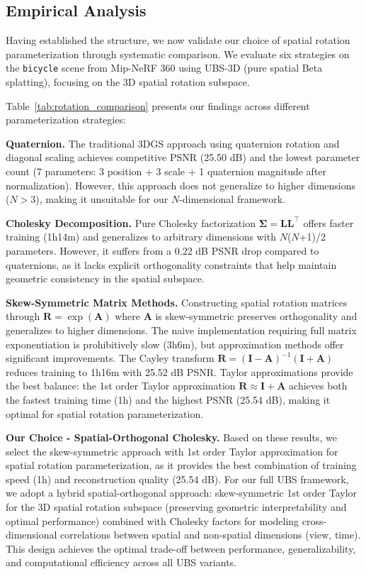 \documentclass{article} %
\begin{document}
\subsection{Empirical Analysis}

Having established the structure, we now validate our choice of spatial rotation parameterization through systematic comparison. We evaluate six strategies on the \texttt{bicycle} scene from Mip-NeRF 360 using UBS-3D (pure spatial Beta splatting), focusing on the 3D spatial rotation subspace.

Table~\ref{tab:rotation_comparison} presents our findings across different parameterization strategies:

\textbf{Quaternion.} The traditional 3DGS approach using quaternion rotation and diagonal scaling achieves competitive PSNR (25.50 dB) and the lowest parameter count (7 parameters: 3 position + 3 scale + 1 quaternion magnitude after normalization). However, this approach does not generalize to higher dimensions ($N > 3$), making it unsuitable for our $N$-dimensional framework.

\textbf{Cholesky Decomposition.} Pure Cholesky factorization $\bm{\Sigma} = \bm{L}\bm{L}^\top$ offers faster training (1h14m) and generalizes to arbitrary dimensions with $N$($N$+1)/2 parameters. However, it suffers from a 0.22 dB PSNR drop compared to quaternions, as it lacks explicit orthogonality constraints that help maintain geometric consistency in the spatial subspace.

\textbf{Skew-Symmetric Matrix Methods.} Constructing spatial rotation matrices through $\bm{R} = \exp(\bm{A})$ where $\bm{A}$ is skew-symmetric preserves orthogonality and generalizes to higher dimensions. The naive implementation requiring full matrix exponentiation is prohibitively slow (3h6m), but approximation methods offer significant improvements. The Cayley transform $\bm{R} = (\bm{I} - \bm{A})^{-1}(\bm{I} + \bm{A})$ reduces training to 1h16m with 25.52 dB PSNR. Taylor approximations provide the best balance: the 1st order Taylor approximation $\bm{R} \approx \bm{I} + \bm{A}$ achieves both the fastest training time (1h) and the highest PSNR (25.54 dB), making it optimal for spatial rotation parameterization.



\textbf{Our Choice - Spatial-Orthogonal Cholesky.} Based on these results, we select the skew-symmetric approach with 1st order Taylor approximation for spatial rotation parameterization, as it provides the best combination of training speed (1h) and reconstruction quality (25.54 dB). For our full UBS framework, we adopt a hybrid spatial-orthogonal approach: skew-symmetric 1st order Taylor for the 3D spatial rotation subspace (preserving geometric interpretability and optimal performance) combined with Cholesky factors for modeling cross-dimensional correlations between spatial and non-spatial dimensions (view, time). This design achieves the optimal trade-off between performance, generalizability, and computational efficiency across all UBS variants.
\end{document}
